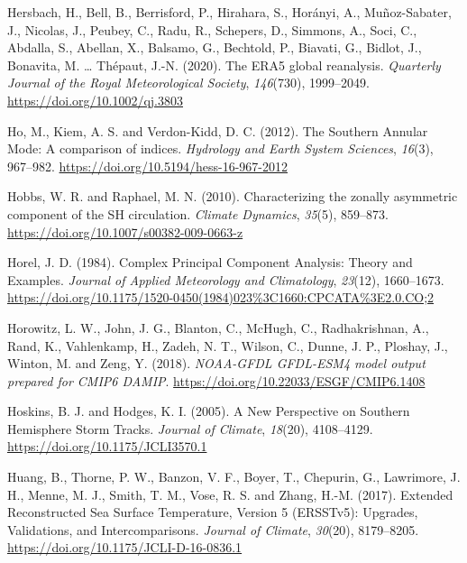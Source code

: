 \documentclass[12pt,oneside,a4paper]{reedthesis}
\newlength{\cslhangindent}
\newenvironment{CSLReferences}[2] %
 {%
  \setlength{\parindent}{0pt}
  \ifodd #1 \everypar{\setlength{\hangindent}{\cslhangindent}}\ignorespaces\fi
  \ifnum #2 > 0
  \setlength{\parskip}{#2\baselineskip}
  \fi
 }%
 {}
\begin{document}
\begin{CSLReferences}{1}{0}
\leavevmode{}%
Hersbach, H., Bell, B., Berrisford, P., Hirahara, S., Horányi, A., Muñoz-Sabater, J., Nicolas, J., Peubey, C., Radu, R., Schepers, D., Simmons, A., Soci, C., Abdalla, S., Abellan, X., Balsamo, G., Bechtold, P., Biavati, G., Bidlot, J., Bonavita, M. \ldots{} Thépaut, J.-N. (2020). The {ERA5} global reanalysis. \emph{Quarterly Journal of the Royal Meteorological Society}, \emph{146}(730), 1999--2049. \url{https://doi.org/10.1002/qj.3803}

\leavevmode{}%
Ho, M., Kiem, A. S. and Verdon-Kidd, D. C. (2012). The {Southern Annular Mode}: A comparison of indices. \emph{Hydrology and Earth System Sciences}, \emph{16}(3), 967--982. \url{https://doi.org/10.5194/hess-16-967-2012}

\leavevmode{}%
Hobbs, W. R. and Raphael, M. N. (2010). Characterizing the zonally asymmetric component of the {SH} circulation. \emph{Climate Dynamics}, \emph{35}(5), 859--873. \url{https://doi.org/10.1007/s00382-009-0663-z}

\leavevmode{}%
Horel, J. D. (1984). Complex {Principal Component Analysis}: {Theory} and {Examples}. \emph{Journal of Applied Meteorology and Climatology}, \emph{23}(12), 1660--1673. \url{https://doi.org/10.1175/1520-0450(1984)023\%3C1660:CPCATA\%3E2.0.CO;2}

\leavevmode{}%
Horowitz, L. W., John, J. G., Blanton, C., McHugh, C., Radhakrishnan, A., Rand, K., Vahlenkamp, H., Zadeh, N. T., Wilson, C., Dunne, J. P., Ploshay, J., Winton, M. and Zeng, Y. (2018). \emph{NOAA-GFDL GFDL-ESM4 model output prepared for CMIP6 DAMIP}. \url{https://doi.org/10.22033/ESGF/CMIP6.1408}

\leavevmode{}%
Hoskins, B. J. and Hodges, K. I. (2005). A {New Perspective} on {Southern Hemisphere Storm Tracks}. \emph{Journal of Climate}, \emph{18}(20), 4108--4129. \url{https://doi.org/10.1175/JCLI3570.1}

\leavevmode{}%
Huang, B., Thorne, P. W., Banzon, V. F., Boyer, T., Chepurin, G., Lawrimore, J. H., Menne, M. J., Smith, T. M., Vose, R. S. and Zhang, H.-M. (2017). Extended {Reconstructed Sea Surface Temperature}, {Version} 5 ({ERSSTv5}): {Upgrades}, {Validations}, and {Intercomparisons}. \emph{Journal of Climate}, \emph{30}(20), 8179--8205. \url{https://doi.org/10.1175/JCLI-D-16-0836.1}


\end{CSLReferences}
\end{document}
